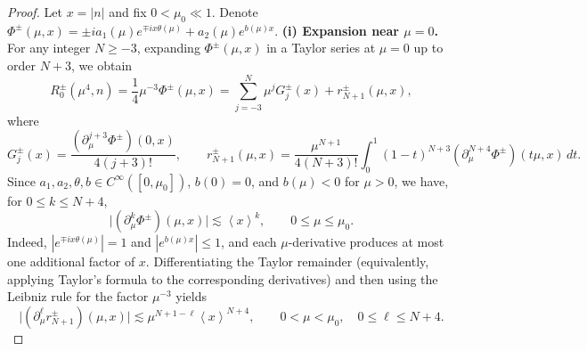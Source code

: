 \documentclass[reqno, 11pt]{amsart}
\numberwithin{equation}{section}
\begin{document}
\begin{proof}
Let $x=|n|$ and fix $0<\mu_0\ll1$. Denote $\Phi^{\pm}(\mu,x)=\pm i a_1(\mu)e^{\mp ix\theta(\mu)}+a_2(\mu)e^{b(\mu)x}$. 
\vskip0.1cm
\textbf{(i) Expansion near $\mu=0$.}
For any integer $N\geq-3$, expanding $\Phi^{\pm}(\mu,x)$ in a Taylor series at $\mu=0$ up to order $N+3$, we obtain
\[
R^{\pm}_0(\mu^4,n)=\frac{1}{4}\mu^{-3}\Phi^{\pm}(\mu,x)
=\sum_{j=-3}^{N}\mu^jG_j^{\pm}(x)+r_{N+1}^{\pm}(\mu,x),
\]
where
\[
G_j^{\pm}(x)=\frac{(\partial_\mu^{j+3}\Phi^{\pm})(0,x)}{4(j+3)!},\qquad
r_{N+1}^{\pm}(\mu,x)
=\frac{\mu^{N+1}}{4(N+3)!}\int_0^1(1-t)^{N+3}
(\partial_\mu^{N+4}\Phi^{\pm})(t\mu,x)\,dt.
\]
Since $a_1,a_2,\theta,b\in C^{\infty}([0,\mu_0])$, $b(0)=0$, and $b(\mu)<0$ for $\mu>0$, we have, for $0\leq k\leq N+4$,
\[
\bigl|(\partial_\mu^k\Phi^{\pm})(\mu,x)\bigr|\lesssim\left<x\right>^k,
\qquad 0\leq\mu\leq\mu_0.
\]
Indeed, $|e^{\mp ix\theta(\mu)}|=1$ and $|e^{b(\mu)x}|\leq1$, and each $\mu$-derivative produces at most one additional factor of $x$. Differentiating the Taylor remainder (equivalently, applying Taylor's formula to the corresponding derivatives) and then using the Leibniz rule for the factor $\mu^{-3}$ yields
\begin{equation}\label{estim for remainder r}
\bigl|(\partial_\mu^{\ell}r_{N+1}^{\pm})(\mu,x)\bigr|
\lesssim \mu^{N+1-\ell}\left<x\right>^{N+4},
\qquad 0<\mu<\mu_0,\quad 0\leq\ell\leq N+4.  
\end{equation}


\end{proof}
\end{document}
